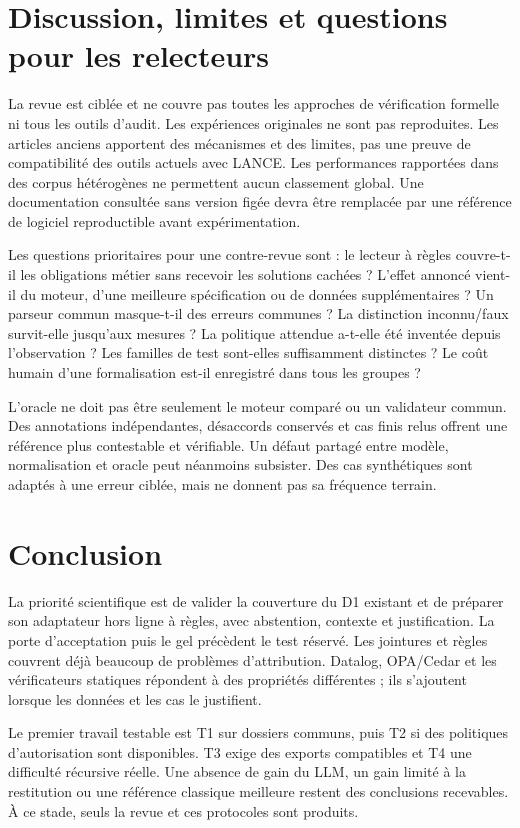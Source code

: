 \documentclass[11pt,a4paper]{article}
\begin{document}
\section{Discussion, limites et questions pour les relecteurs}
La revue est ciblée et ne couvre pas toutes les approches de vérification
formelle ni tous les outils d'audit. Les expériences originales ne sont pas
reproduites. Les articles anciens apportent des mécanismes et des limites,
pas une preuve de compatibilité des outils actuels avec LANCE. Les performances
rapportées dans des corpus hétérogènes ne permettent aucun classement global.
Une documentation consultée sans version figée devra être remplacée par une
référence de logiciel reproductible avant expérimentation.

Les questions prioritaires pour une contre-revue sont : le lecteur à règles couvre-t-il les
obligations métier sans recevoir les solutions cachées ? L'effet annoncé vient-il
du moteur, d'une meilleure spécification ou de données supplémentaires ? Un
parseur commun masque-t-il des erreurs communes ? La distinction inconnu/faux
survit-elle jusqu'aux mesures ? La politique attendue a-t-elle été inventée
depuis l'observation ? Les familles de test sont-elles suffisamment distinctes ?
Le coût humain d'une formalisation est-il enregistré dans tous les groupes ?

L'oracle ne doit pas être seulement le moteur comparé ou un validateur commun.
Des annotations indépendantes, désaccords conservés et cas finis relus offrent
une référence plus contestable et vérifiable. Un défaut partagé entre modèle,
normalisation et oracle peut néanmoins subsister. Des cas synthétiques sont
adaptés à une erreur ciblée, mais ne donnent pas sa fréquence terrain.

\section{Conclusion}
La priorité scientifique est de valider la couverture du D1 existant et de
préparer son adaptateur hors ligne à règles, avec abstention, contexte et
justification. La porte d'acceptation puis le gel précèdent le test réservé.
Les jointures et règles couvrent déjà beaucoup de problèmes d'attribution.
Datalog, OPA/Cedar et les vérificateurs statiques répondent à des propriétés
différentes ; ils s'ajoutent lorsque les données et les cas le justifient.

Le premier travail testable est T1 sur dossiers communs, puis T2 si des
politiques d'autorisation sont disponibles. T3 exige des exports compatibles
et T4 une difficulté récursive réelle. Une absence de gain du LLM, un gain limité
à la restitution ou une référence classique meilleure restent des conclusions
recevables. À ce stade, seuls la revue et ces protocoles sont produits.
\end{document}
